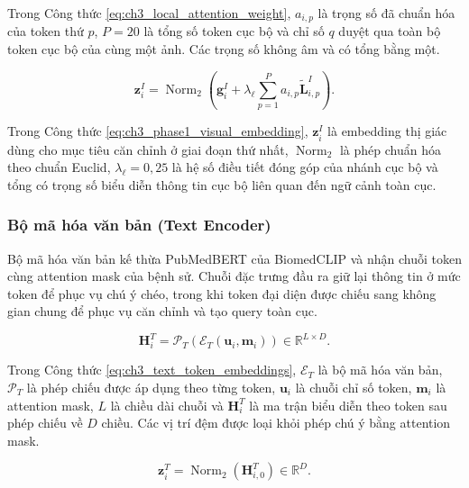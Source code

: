 Trong Công thức \ref{eq:ch3_local_attention_weight}, $a_{i,p}$ là trọng số đã chuẩn hóa của token thứ $p$, $P=20$ là tổng số token cục bộ và chỉ số $q$ duyệt qua toàn bộ token cục bộ của cùng một ảnh. Các trọng số không âm và có tổng bằng một.

\begin{equation}\boldsymbol{z}_{i}^{I}=\operatorname{Norm}_{2}\left(\boldsymbol{g}_{i}^{I}+\lambda_{\ell}\sum_{p=1}^{P}a_{i,p}\widetilde{\boldsymbol{L}}_{i,p}^{I}\right).\label{eq:ch3_phase1_visual_embedding}\end{equation}

Trong Công thức \ref{eq:ch3_phase1_visual_embedding}, $\boldsymbol{z}_{i}^{I}$ là embedding thị giác dùng cho mục tiêu căn chỉnh ở giai đoạn thứ nhất, $\operatorname{Norm}_{2}$ là phép chuẩn hóa theo chuẩn Euclid, $\lambda_{\ell}=0{,}25$ là hệ số điều tiết đóng góp của nhánh cục bộ và tổng có trọng số biểu diễn thông tin cục bộ liên quan đến ngữ cảnh toàn cục.

\subsubsection{Bộ mã hóa văn bản (Text Encoder)}

Bộ mã hóa văn bản kế thừa PubMedBERT của BiomedCLIP và nhận chuỗi token cùng attention mask của bệnh sử. Chuỗi đặc trưng đầu ra giữ lại thông tin ở mức token để phục vụ chú ý chéo, trong khi token đại diện được chiếu sang không gian chung để phục vụ căn chỉnh và tạo query toàn cục.

\begin{equation}\boldsymbol{H}_{i}^{T}=\mathcal{P}_{T}\left(\mathcal{E}_{T}\left(\boldsymbol{u}_{i},\boldsymbol{m}_{i}\right)\right)\in\mathbb{R}^{L\times D}.\label{eq:ch3_text_token_embeddings}\end{equation}

Trong Công thức \ref{eq:ch3_text_token_embeddings}, $\mathcal{E}_{T}$ là bộ mã hóa văn bản, $\mathcal{P}_{T}$ là phép chiếu được áp dụng theo từng token, $\boldsymbol{u}_{i}$ là chuỗi chỉ số token, $\boldsymbol{m}_{i}$ là attention mask, $L$ là chiều dài chuỗi và $\boldsymbol{H}_{i}^{T}$ là ma trận biểu diễn theo token sau phép chiếu về $D$ chiều. Các vị trí đệm được loại khỏi phép chú ý bằng attention mask.

\begin{equation}\boldsymbol{z}_{i}^{T}=\operatorname{Norm}_{2}\left(\boldsymbol{H}_{i,0}^{T}\right)\in\mathbb{R}^{D}.\label{eq:ch3_global_text_embedding}\end{equation}

